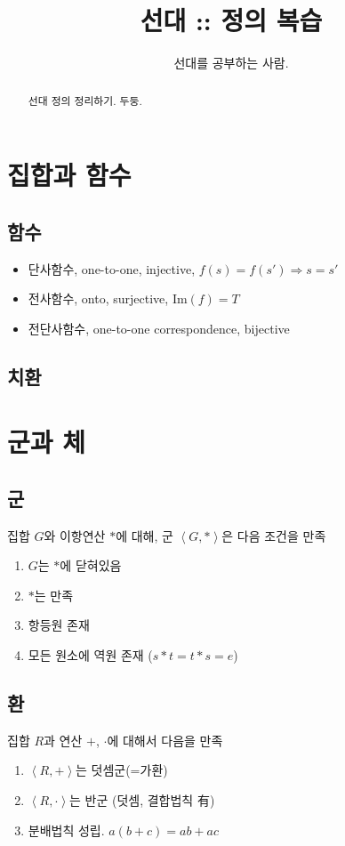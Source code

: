 \documentclass[oneside]{oblivoir}
\title{선대 :: 정의 복습}
\author{선대를 공부하는 사람. }
\begin{document}
\maketitle
\begin{abstract}
선대 정의 정리하기. 두둥.
\end{abstract}

\newpage

\setcounter{section}{0}
\section{집합과 함수}
\subsection{함수}
\begin{itemize}
    \item 단사함수, one-to-one, injective, $f(s)=f(s') \Rightarrow s=s'$
    \item 전사함수, onto, surjective, $\mathrm{Im}(f)=T$
    \item 전단사함수, one-to-one correspondence, bijective
\end{itemize}

\subsection{치환}


\section{군과 체}
\subsection{군}
집합 $G$와 이항연산 $\ast$에 대해, 군 $\left\langle G,\ast \right\rangle$은 다음 조건을 만족
\begin{enumerate}
    \item $G$는 $\ast$에 닫혀있음
    \item $\ast$는  만족
    \item 항등원 존재
    \item 모든 원소에 역원 존재 ($s \ast t = t \ast s = e $)
\end{enumerate}

\subsection{환}
집합 $R$과 연산 $+$, $\cdot$에 대해서 다음을 만족
\begin{enumerate}
    \item $\left\langle R, + \right\rangle$는 덧셈군(=가환)
    \item $\left\langle R, \cdot \right\rangle$는 반군 (덧셈, 결합법칙 有)
    \item 분배법칙 성립. $a(b+c)=ab+ac$
\end{enumerate}
\end{document}
